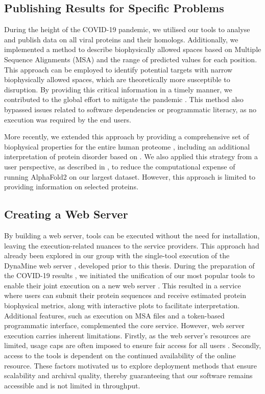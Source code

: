 \subsection{Publishing Results for Specific Problems}

During the height of the COVID-19 pandemic, we utilised our tools to analyse and publish data on all viral proteins and their homologs. Additionally, we implemented a method to describe biophysically allowed spaces based on Multiple Sequence Alignments (MSA) and the range of predicted values for each position. This approach can be employed to identify potential targets with narrow biophysically allowed spaces, which are theoretically more susceptible to disruption. By providing this critical information in a timely manner, we contributed to the global effort to mitigate the pandemic \cite{kagami_online_2021}. This method also bypassed issues related to software dependencies or programmatic literacy, as no execution was required by the end users.

More recently, we extended this approach by providing a comprehensive set of biophysical properties for the entire human proteome \cite{bio2byte_bio2bytes_nodate}, including an additional interpretation of protein disorder based on \cite{roca-martinez_challenges_2022}. We also applied this strategy from a user perspective, as described in \cite{gavalda-garcia_gradations_2024}, to reduce the computational expense of running AlphaFold2 on our largest dataset. However, this approach is limited to providing information on selected proteins.


\subsection{Creating a Web Server}

By building a web server, tools can be executed without the need for installation, leaving the execution-related nuances to the service providers. This approach had already been explored in our group with the single-tool execution of the DynaMine web server \cite{cilia_protein_2013, cilia_dynamine_2014}, developed prior to this thesis. During the preparation of the COVID-19 results \cite{kagami_online_2021}, we initiated the unification of our most popular tools to enable their joint execution on a new web server \cite{kagami_b2btools_2021}. This resulted in a service where users can submit their protein sequences and receive estimated protein biophysical metrics, along with interactive plots to facilitate interpretation. Additional features, such as execution on MSA files and a token-based programmatic interface, complemented the core service. However, web server execution carries inherent limitations. Firstly, as the web server's resources are limited, usage caps are often imposed to ensure fair access for all users \cite{abramson_accurate_2024, kagami_b2btools_2021}. Secondly, access to the tools is dependent on the continued availability of the online resource. These factors motivated us to explore deployment methods that ensure scalability and archival quality, thereby guaranteeing that our software remains accessible and is not limited in throughput.

